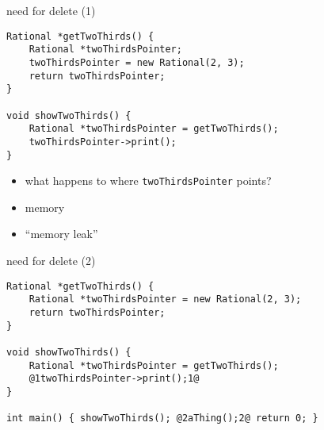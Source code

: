 \begin{frame}[fragile,label=cppNewDelete]{need for delete (1)}
\lstset{
    language=C++,
    style=smaller,
}
\begin{lstlisting}
Rational *getTwoThirds() {
    Rational *twoThirdsPointer;
    twoThirdsPointer = new Rational(2, 3);
    return twoThirdsPointer;
}

void showTwoThirds() {
    Rational *twoThirdsPointer = getTwoThirds();
    twoThirdsPointer->print();
}
\end{lstlisting}
\begin{itemize}
    \item what happens to where \texttt{twoThirdsPointer} points?
    \item<2> memory 
    \item<2> ``memory leak''
\end{itemize}
\end{frame}

\begin{frame}[fragile,label=cppNewDelete2]{need for delete (2)}
\begin{lstlisting}
Rational *getTwoThirds() {
    Rational *twoThirdsPointer = new Rational(2, 3);
    return twoThirdsPointer;
}

void showTwoThirds() {
    Rational *twoThirdsPointer = getTwoThirds();
    @1twoThirdsPointer->print();1@
}

int main() { showTwoThirds(); @2aThing();2@ return 0; }
\end{lstlisting}
\end{frame}

